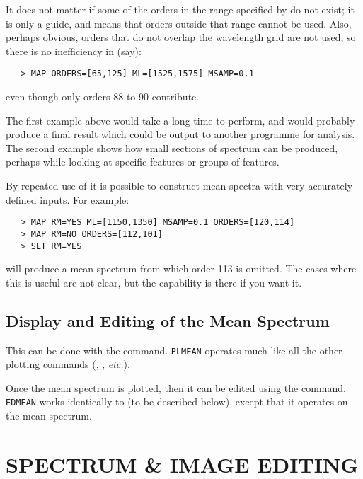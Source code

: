 It does not matter if some of the orders in the range specified by
 do not exist; it is only a guide, and
means that orders outside that range cannot be used.  Also, perhaps
obvious, orders that do not overlap the wavelength grid are not used, so
there is no inefficiency in (say):

\begin{verbatim}
   > MAP ORDERS=[65,125] ML=[1525,1575] MSAMP=0.1
\end{verbatim}

even though only orders 88 to 90 contribute.

The first example above would take a long time to perform, and would
probably produce a final result which could be output to another programme
for analysis.  The second example shows how small sections of spectrum
can be produced, perhaps while looking at specific features or groups of
features.

By repeated use of 
 it is possible to construct mean spectra with very
accurately defined inputs.  For example:

\begin{verbatim}
   > MAP RM=YES ML=[1150,1350] MSAMP=0.1 ORDERS=[120,114]
   > MAP RM=NO ORDERS=[112,101]
   > SET RM=YES
\end{verbatim}

will produce a mean spectrum from which order 113 is omitted.  The cases
where this is useful are not clear, but the capability is there if you want it.


\subsection{Display and Editing of the Mean Spectrum}

This can be done with the 
 command.  \verb+PLMEAN+ operates much
like all the other plotting commands (,
, {\it etc.})\@.

Once the mean spectrum is plotted, then it can be edited using the
 command.  \verb+EDMEAN+ works identically to
 (to be described below), except that it
operates on the mean spectrum.


\section{\label{se:spec_edit}SPECTRUM \& IMAGE
         EDITING}

